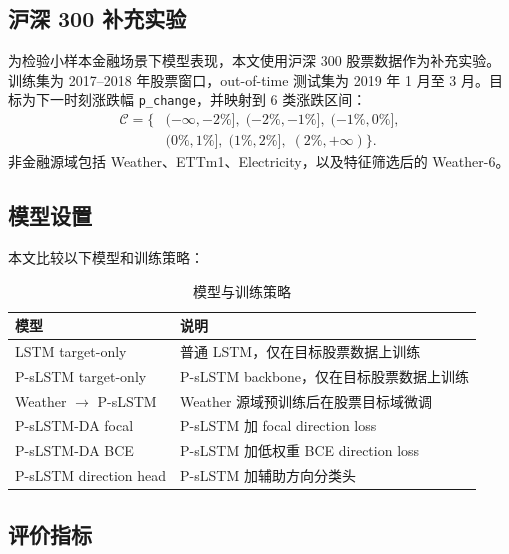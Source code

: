\documentclass[UTF8,zihao=-4,twocolumn,fontset=fandol]{ctexart}
\begin{document}
\subsection{沪深 300 补充实验}

为检验小样本金融场景下模型表现，本文使用沪深 300 股票数据作为补充实验。训练集为 2017--2018 年股票窗口，out-of-time 测试集为 2019 年 1 月至 3 月。目标为下一时刻涨跌幅 \texttt{p\_change}，并映射到 6 类涨跌区间：
\begin{equation}
\begin{aligned}
\mathcal{C}=\{&(-\infty,-2\%],\;(-2\%,-1\%],\;(-1\%,0\%],\\
&(0\%,1\%],\;(1\%,2\%],\;(2\%,+\infty)\}.
\end{aligned}
\end{equation}
非金融源域包括 Weather、ETTm1、Electricity，以及特征筛选后的 Weather-6。

\subsection{模型设置}

本文比较以下模型和训练策略：

\begin{table}[H]
\centering
\caption{模型与训练策略}
\label{tab:model_setting}
\begin{tabular}{@{}>{\raggedright\arraybackslash}p{}>{\raggedright\arraybackslash}p{}@{}}
\toprule
模型 & 说明 \\
\midrule
LSTM target-only & 普通 LSTM，仅在目标股票数据上训练 \\
P-sLSTM target-only & P-sLSTM backbone，仅在目标股票数据上训练 \\
Weather $\rightarrow$ P-sLSTM & Weather 源域预训练后在股票目标域微调 \\
P-sLSTM-DA focal & P-sLSTM 加 focal direction loss \\
P-sLSTM-DA BCE & P-sLSTM 加低权重 BCE direction loss \\
P-sLSTM direction head & P-sLSTM 加辅助方向分类头 \\
\bottomrule
\end{tabular}
\end{table}

\subsection{评价指标}
\end{document}
